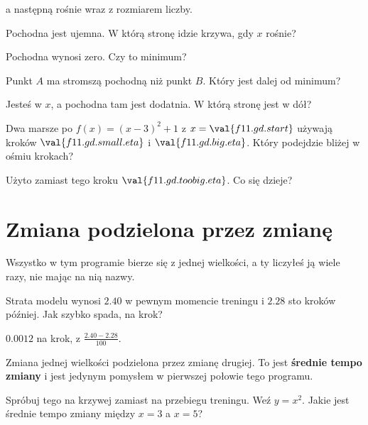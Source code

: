 \begin{quiz}
{  a następną rośnie wraz z rozmiarem liczby.}
\item Pochodna jest ujemna. W którą stronę idzie krzywa, gdy $x$ rośnie?
\item Pochodna wynosi zero. Czy to minimum? 
\item Punkt $A$ ma stromszą pochodną niż punkt $B$. Który jest dalej od
  minimum? 
\item Jesteś w $x$, a pochodna tam jest dodatnia. W którą stronę jest w dół?
\item Dwa marsze po $f(x) = (x-3)^{2} + 1$ z $x = \val{f11.gd.start}$ używają
  kroków $\val{f11.gd.small.eta}$ i $\val{f11.gd.big.eta}$. Który podejdzie
  bliżej w ośmiu krokach? 
\item Użyto zamiast tego kroku $\val{f11.gd.toobig.eta}$. Co się dzieje?
\end{quiz}

\section{Zmiana podzielona przez zmianę}
\label{sec:F11-average}

\begin{fr}
Wszystko w tym programie bierze się z jednej wielkości, a ty liczyłeś ją wiele
razy, nie mając na nią nazwy.

Strata modelu wynosi $\num{2.40}$ w pewnym momencie treningu i $\num{2.28}$
sto kroków później. Jak szybko spada, na krok?
\nextframe
\end{fr}

\begin{fr}
\begin{ansblock}
$\num{0.0012}$ na krok, z $\frac{\num{2.40} - \num{2.28}}{100}$.
\end{ansblock}

Zmiana jednej wielkości podzielona przez zmianę drugiej. To jest
\textbf{średnie tempo zmiany} i jest jedynym pomysłem w pierwszej połowie tego
programu.

Spróbuj tego na krzywej zamiast na przebiegu treningu. Weź $y = x^{2}$. Jakie
jest średnie tempo zmiany między $x = 3$ a $x = 5$?
\nextframe
\end{fr}

